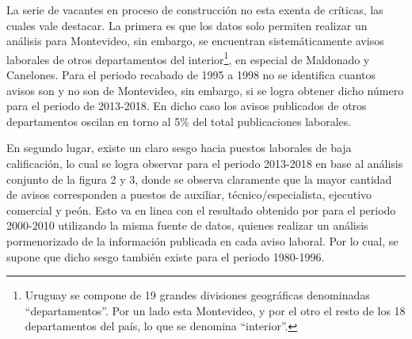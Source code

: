 
La serie de vacantes en proceso de construcción no esta exenta de críticas, las cuales vale destacar. La primera es que los datos solo permiten realizar un análisis para Montevideo, sin embargo, se encuentran sistemáticamente avisos laborales de otros departamentos del interior\footnote{Uruguay se compone de 19 grandes divisiones geográficas denominadas ``departamentos''. Por un lado esta Montevideo, y por el otro el resto de los 18 departamentos del país, lo que se denomina ``interior''.}, en especial de Maldonado y Canelones. Para el periodo recabado de 1995 a 1998 no se identifica cuantos avisos son y no son de Montevideo, sin embargo, si se logra obtener dicho número para el periodo de 2013-2018. En dicho caso los avisos publicados de otros departamentos oscilan en torno al 5\% del total publicaciones laborales. 

En segundo lugar, existe un claro sesgo hacia puestos laborales de baja calificación, lo cual se logra observar para el periodo 2013-2018 en base al análisis conjunto de la figura 2 y 3, donde se observa claramente que la mayor cantidad de avisos corresponden a puestos de auxiliar, técnico/especialista, ejecutivo comercial y peón. Esto va en linea con el resultado obtenido por \cite{Alma2011} para el periodo 2000-2010 utilizando la misma fuente de datos, quienes realizar un análisis pormenorizado de la información publicada en cada aviso laboral. Por lo cual, se supone que dicho sesgo también existe para el periodo 1980-1996.

